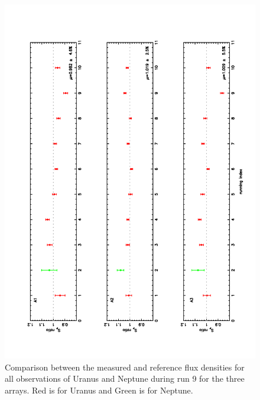 \begin{figure}
\begin{center}
  \includegraphics[clip, angle=-90, scale=0.6]{Figures/ratio_Ura_Nept.pdf}
  \caption{Comparison between the measured and reference flux densities for all observations of Uranus and Neptune during run 9
    for the three arrays. Red is for Uranus and Green is for Neptune.}
\label{fig:U_N_ratio}
\end{center}
\end{figure}



